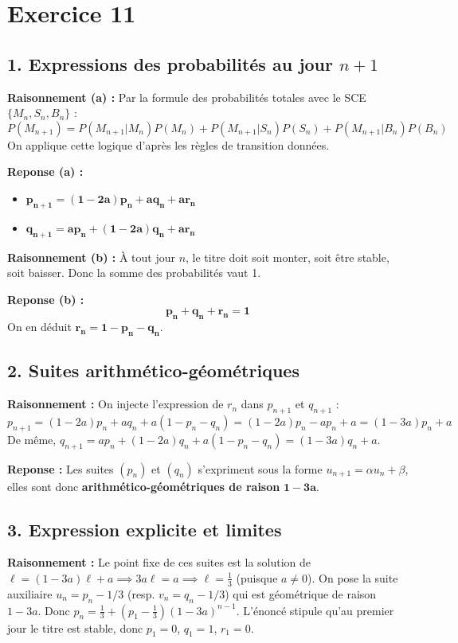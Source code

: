 \documentclass[11pt,a4paper]{article}
\begin{document}
\hrulefill

\section*{Exercice 11}

\subsection*{1. Expressions des probabilités au jour $n+1$}

\textbf{Raisonnement (a) :} Par la formule des probabilités totales avec le SCE $\{M_n, S_n, B_n\}$ :
$$P(M_{n+1}) = P(M_{n+1}|M_n)P(M_n) + P(M_{n+1}|S_n)P(S_n) + P(M_{n+1}|B_n)P(B_n)$$
On applique cette logique d'après les règles de transition données.

\textbf{Reponse (a) :}
\begin{itemize}
    \item $\mathbf{p_{n+1} = (1-2a)p_n + a q_n + a r_n}$
    \item $\mathbf{q_{n+1} = a p_n + (1-2a)q_n + a r_n}$
\end{itemize}

\textbf{Raisonnement (b) :} À tout jour $n$, le titre doit soit monter, soit être stable, soit baisser. Donc la somme des probabilités vaut 1.

\textbf{Reponse (b) :}
$$ \mathbf{p_n + q_n + r_n = 1} $$
On en déduit $\mathbf{r_n = 1 - p_n - q_n}$.

\subsection*{2. Suites arithmético-géométriques}

\textbf{Raisonnement :} On injecte l'expression de $r_n$ dans $p_{n+1}$ et $q_{n+1}$ :
$$p_{n+1} = (1-2a)p_n + a q_n + a(1 - p_n - q_n) = (1-2a)p_n - a p_n + a = (1-3a)p_n + a$$
De même, $q_{n+1} = a p_n + (1-2a)q_n + a(1 - p_n - q_n) = (1-3a)q_n + a$.

\textbf{Reponse :} Les suites $(p_n)$ et $(q_n)$ s'expriment sous la forme $u_{n+1} = \alpha u_n + \beta$, elles sont donc \textbf{arithmético-géométriques de raison} $\mathbf{1-3a}$.

\subsection*{3. Expression explicite et limites}

\textbf{Raisonnement :} Le point fixe de ces suites est la solution de $\ell = (1-3a)\ell + a \implies 3a\ell = a \implies \ell = \frac{1}{3}$ (puisque $a \neq 0$).
On pose la suite auxiliaire $u_n = p_n - 1/3$ (resp. $v_n = q_n - 1/3$) qui est géométrique de raison $1-3a$.
Donc $p_n = \frac{1}{3} + (p_1 - \frac{1}{3})(1-3a)^{n-1}$.
L'énoncé stipule qu'au premier jour le titre est stable, donc $p_1 = 0$, $q_1 = 1$, $r_1 = 0$.
\end{document}
